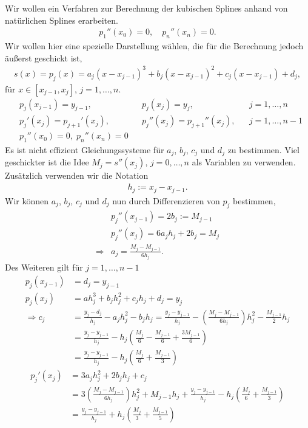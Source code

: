Wir wollen ein Verfahren zur Berechnung der kubischen Splines anhand von 
natürlichen Splines erarbeiten.
\begin{align*}
p_1''(x_0) = 0,\quad p_n''(x_n) = 0.
\end{align*}
Wir wollen hier eine spezielle Darstellung wählen, die für die Berechnung
jedoch äußerst geschickt ist,
\begin{align*}
s(x) = p_j(x) = a_j(x-x_{j-1})^3 + b_j(x-x_{j-1})^2 + c_j(x-x_{j-1}) + d_j,
\end{align*}
für $x\in[x_{j-1},x_j]$, $j=1,\ldots,n$.
\begin{align*}
&p_j(x_{j-1}) = y_{j-1},&& p_j(x_j) = y_j,&& j=1,\ldots,n\\
&p_j'(x_j) = p_{j+1}'(x_j),&& p_j''(x_j) = p_{j+1}''(x_j),&&
j=1,\ldots,n-1\\
&p_1''(x_0) = 0,\; p_n''(x_n) = 0
\end{align*}
Es ist nicht effizient Gleichungssysteme für $a_j$, $b_j$, $c_j$ und $d_j$ zu
bestimmen. Viel geschickter ist die Idee $M_j=s''(x_j)$,
$j=0,\ldots,n$ als Variablen zu verwenden. Zusätzlich verwenden wir die Notation
\begin{align*}
h_j := x_j -x_{j-1}.
\end{align*}
Wir können $a_j$, $b_j$, $c_j$ und $d_j$ nun durch Differenzieren von $p_j$
bestimmen,
\begin{align*}
&p_j''(x_{j-1}) = 2b_j := M_{j-1}\\
&p_j''(x_j) = 6a_j h_j + 2b_j = M_j\\
\Rightarrow & a_j = \frac{M_j-M_{j-1}}{6h_j}.
\end{align*}
Des Weiteren gilt für $j=1,\ldots,n-1$
\begin{align*}
p_j(x_{j-1}) &= d_j = y_{j-1}\\
p_j(x_j) &= ah_j^3 + b_jh_j^2 + c_j h_j + d_j = y_j\\
\Rightarrow c_j &= \frac{y_j-d_j}{h_j} - a_j h_j^2 - b_j h_j
= \frac{y_j-y_{j-1}}{h_j}-\left(\frac{M_j-M_{j-1}}{6h_j}\right)h_j^2 -
\frac{M_{j-1}}{2}h_j \\
&=\frac{y_j-y_{j-1}}{h_j}-h_j\left(\frac{M_j}{6} -
\frac{M_{j-1}}{6}+\frac{3M_{j-1}}{6}\right)\\
&=\frac{y_j-y_{j-1}}{h_j} - h_j\left(\frac{M_j}{6} + \frac{M_{j-1}}{3} \right)
\end{align*}
\begin{align*}
p_j'(x_j) &= 3a_j h_j^2 + 2b_jh_j + c_j\\
&= 3\left(\frac{M_j-M_{j-1}}{6h_j} \right)h_j^2 + M_{j-1}h_j +
\frac{y_j-y_{j-1}}{h_j} - h_j\left(\frac{M_j}{6}+\frac{M_{j-1}}{3}\right)
\\ &= \frac{y_j-y_{j-1}}{h_j} + h_j\left(\frac{M_j}{3} +
\frac{M_{j-1}}{5}\right)
\end{align*}
